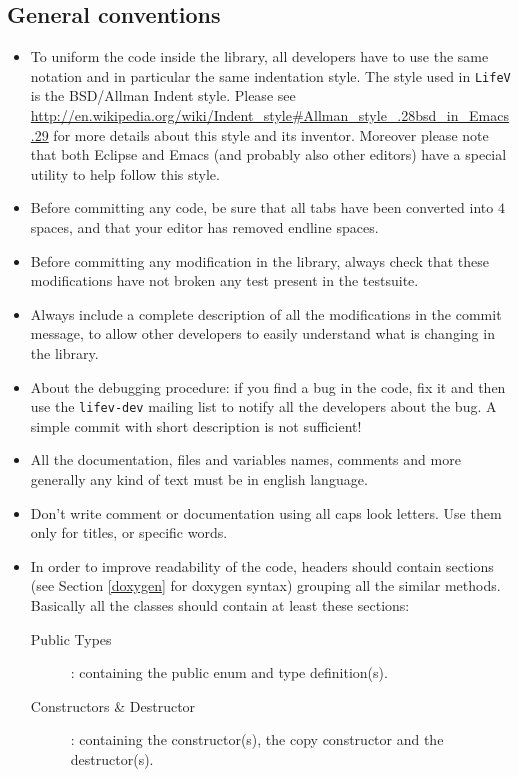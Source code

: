 \documentclass[a4paper]{article}
\begin{document}
\subsection{General conventions}
\begin{itemize}
  \item To uniform the code inside the library, all developers have to
  use the same notation and in particular the same indentation style. The style
  used in \texttt{LifeV} is the BSD/Allman Indent style. Please see
  \url{http://en.wikipedia.org/wiki/Indent_style#Allman_style_.28bsd_in_Emacs.29}
  for more details about this style and its inventor.
  Moreover please note that both Eclipse and Emacs (and probably also other editors)
  have a special utility to help follow this style.
  \item Before committing any code, be sure that all tabs have been converted
  into $4$ spaces, and that your editor has removed endline spaces.
  \item Before committing any modification in the library, always check
  that these modifications have not broken any test present in the
  testsuite.
  \item Always include a complete description of all the modifications in the
  commit message, to allow other developers to easily understand what is
  changing in the library.
  \item About the debugging procedure: if you find a bug in the code, fix it
  and then use the \texttt{lifev-dev} mailing list to notify all the developers
  about the bug. A simple commit with short description is not sufficient!
  \item All the documentation, files and variables names, comments and more
  generally any kind of text must be in english language.
  \item Don't write comment or documentation using all caps look letters. Use
  them only for titles, or specific words.
  \item In order to improve readability of the code, headers should
  contain sections (see Section \ref{doxygen} for doxygen syntax) grouping
  all the similar methods. Basically all the classes should contain at least
  these sections:
  \begin{description}
      \item[Public Types]: containing the public enum and type definition(s).
	  \item[Constructors \& Destructor]: containing the constructor(s), the
      copy constructor and the destructor(s).

\end{description}
\end{itemize}
\end{document}
